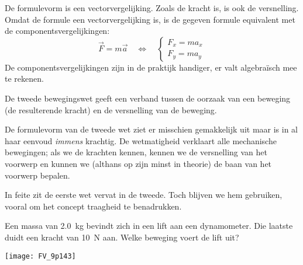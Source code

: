 \documentclass{ximera}
\begin{document}
\begin{remark}{De formulevorm is een vectorvergelijking.} Zoals de kracht is, is ook de versnelling. Omdat de formule een vectorvergelijking is, is de gegeven formule equivalent met de componentsvergelijkingen:
	\begin{equation*}
		\vec{F}=m\vec{a}\quad\Leftrightarrow\quad
		\begin{cases}
			F_x=ma_x \\
			F_y=ma_y
		\end{cases}
	\end{equation*}
	De componentsvergelijkingen zijn in de praktijk handiger, er valt algebra\"isch mee te rekenen.
\end{remark}

De tweede bewegingswet geeft een verband tussen de oorzaak van een beweging (de resulterende kracht) en de versnelling van de beweging.

De formulevorm van de tweede wet ziet er misschien gemakkelijk uit maar is in al haar eenvoud \emph{immens} krachtig. De wetmatigheid verklaart alle mechanische bewegingen; als we de krachten kennen, kennen we de versnelling van het voorwerp en kunnen we (althans op zijn minst in theorie) de baan van het voorwerp bepalen.

In feite zit de eerste wet vervat in de tweede. Toch blijven we hem gebruiken, vooral om het concept traagheid te benadrukken.


\begin{exercise}
	Een massa van \SI{2,0}{kg} bevindt zich in een lift aan een dynamometer. Die laatste duidt een kracht van \SI{10}{N} aan. Welke beweging voert de lift uit?

	\begin{minipage}[c]{.8\linewidth}
	\begin{multipleChoice}
	\end{multipleChoice}
	\end{minipage}
	\hfill
	\begin{minipage}{.15\linewidth}
	\begin{image}
		\texttt{[image: FV\_9p143]}%
	\end{image}
	\end{minipage}
\end{exercise}
\end{document}
